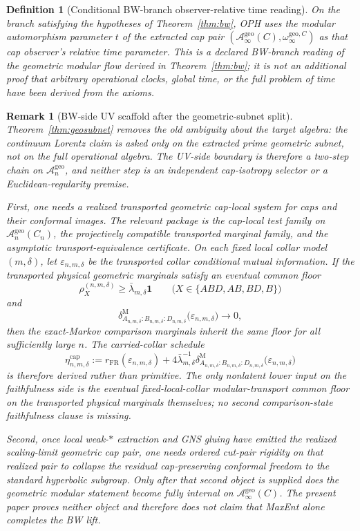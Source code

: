 \documentclass[11pt]{article}
\newtheorem{definition}[theorem]{Definition}
\newtheorem{remark}[theorem]{Remark}
\begin{document}
\begin{definition}[Conditional BW-branch observer-relative time reading]\label{def:modulartime}
On the branch satisfying the hypotheses of Theorem~\ref{thm:bw}, OPH uses the modular
automorphism parameter \(t\) of the extracted cap pair
\((\mathcal A_\infty^{\mathrm{geo}}(C),\omega_\infty^{\mathrm{geo},C})\) as that cap
observer's relative time parameter. This is a declared BW-branch reading of the geometric
modular flow derived in Theorem~\ref{thm:bw}; it is not an additional proof that arbitrary
operational clocks, global time, or the full problem of time have been derived from the axioms.
\end{definition}

\begin{remark}[BW-side UV scaffold after the geometric-subnet split]
Theorem~\ref{thm:geosubnet} removes the old ambiguity about the target algebra: the continuum Lorentz claim is asked only on the extracted prime geometric subnet, not on the full operational algebra. The UV-side boundary is therefore a two-step chain on \(\mathcal A_n^{\mathrm{geo}}\), and neither step is an independent cap-isotropy selector or a Euclidean-regularity premise.

First, one needs a \emph{realized transported geometric cap-local system} for caps and their conformal images. The relevant package is the cap-local test family on \(\mathcal A_n^{\mathrm{geo}}(C_n)\), the projectively compatible transported marginal family, and the asymptotic transport-equivalence certificate. On each fixed local collar model \((m,\delta)\), let \(\varepsilon_{n,m,\delta}\) be the transported collar conditional mutual information. If the transported physical geometric marginals satisfy an eventual common floor
\[
\rho_X^{(n,m,\delta)}\ge \bar\lambda_{m,\delta}\mathbf 1
\qquad
\bigl(X\in\{ABD,AB,BD,B\}\bigr)
\]
and
\[
\delta^{\mathrm M}_{A_{n,m,\delta}:B_{n,m,\delta}:D_{n,m,\delta}}
\bigl(\varepsilon_{n,m,\delta}\bigr)\to 0,
\]
then the exact-Markov comparison marginals inherit the same floor for all sufficiently large \(n\). The carried-collar schedule
\[
\eta_{n,m,\delta}^{\mathrm{cap}}
:=
r_{\mathrm{FR}}(\varepsilon_{n,m,\delta})
+
4\bar\lambda_{m,\delta}^{-1}
\delta^{\mathrm M}_{A_{n,m,\delta}:B_{n,m,\delta}:D_{n,m,\delta}}
\bigl(\varepsilon_{n,m,\delta}\bigr)
\]
is therefore \emph{derived rather than primitive}. The only nonlatent lower input on the faithfulness side is the eventual fixed-local-collar modular-transport common floor on the transported physical marginals themselves; no second comparison-state faithfulness clause is missing.

Second, once local weak-\(*\) extraction and GNS gluing have emitted the realized scaling-limit geometric cap pair, one needs \emph{ordered cut-pair rigidity} on that realized pair to collapse the residual cap-preserving conformal freedom to the standard hyperbolic subgroup. Only after that second object is supplied does the geometric modular statement become fully internal on \(\mathcal A_\infty^{\mathrm{geo}}(C)\). The present paper proves neither object and therefore does not claim that MaxEnt alone completes the BW lift.
\end{remark}
\end{document}

